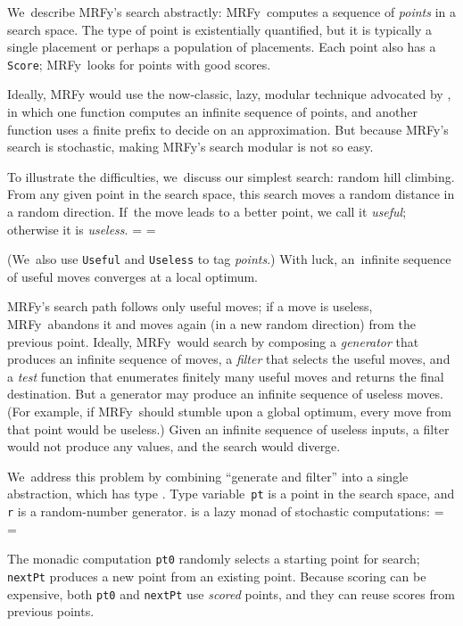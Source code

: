 \documentclass[preprint,nonatbib,blockstyle,times]{sigplanconf}
\newcommand\mrfy{MRFy} %
\newif\ifverbatimsmall
\newcommand\smallverbatiminput[1]{%
  \verbatimsmalltrue
  \presvtopsep=\topsep
  \topsep=0.78\topsep
  \verbatimsmallfalse
  \topsep=\presvtopsep
}
\begin{document}
We~describe \mrfy's search abstractly: \mrfy\ computes a sequence
of \emph{points} in a search space.
The type of point is existentially quantified, but it is typically
a single placement or perhaps a population of placements. 
Each point also has a \texttt{Score}; \mrfy\ looks for points with
good scores.

Ideally, MRFy would use the now-classic, lazy, modular
technique advocated by \citet{hughes:why}, in which one function
computes an infinite sequence of points, and another function
uses a finite prefix to decide on an approximation.
But because MRFy's search is stochastic, 
making MRFy's search modular is not so easy.

To illustrate the difficulties, we~discuss our simplest search:
random hill climbing.
From any given point in the search space, this search moves a random
distance in a random 
direction.
If~the move leads to a better point, 
we call it \emph{useful};
otherwise it is \emph{useless}.
\smallverbatiminput{utility}
(We~also use \texttt{Useful} and \texttt{Useless} to tag \emph{points}.)
With luck, an~infinite sequence of useful moves converges
at a local optimum.

\mrfy's search path follows only useful moves;
if a move is useless, 
\mrfy\ abandons it and moves again (in a new random direction) from the
previous point.
Ideally, \mrfy\ would search by composing a \emph{generator}
that produces an infinite sequence of moves, 
a \emph{filter} that selects the useful moves, and 
a \emph{test} function that enumerates finitely many useful moves
and returns the final destination.
But a generator may produce an infinite sequence of useless moves.
(For example, if \mrfy\ should stumble upon a global optimum, every move from
that point would be useless.)
Given an infinite sequence of useless inputs, a filter would not
produce any values, and the search would diverge.





We~address this problem by combining ``generate and filter'' into a
single abstraction, which has type .
Type variable~\texttt{pt} is a point in the search
space, and \texttt{r} is a
random-number generator.
 is a lazy monad of stochastic computations:
\smallverbatiminput{gen.tex}
The monadic computation \texttt{pt0} randomly selects a starting point
for search;
\texttt{nextPt} produces a new point from
an existing point.
Because scoring can be expensive, both \texttt{pt0}
and \texttt{nextPt} use \emph{scored} points, and they can
reuse scores from previous points.
\end{document}
